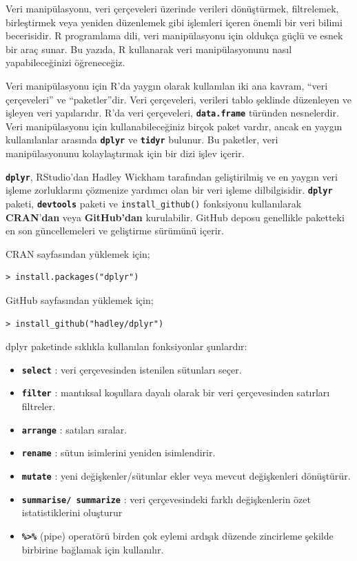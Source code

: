 \documentclass[
  letterpaper,
  DIV=11,
  numbers=noendperiod]{scrreprt}
\begin{document}
Veri manipülasyonu, veri çerçeveleri üzerinde verileri dönüştürmek,
filtrelemek, birleştirmek veya yeniden düzenlemek gibi işlemleri içeren
önemli bir veri bilimi becerisidir. R programlama dili, veri
manipülasyonu için oldukça güçlü ve esnek bir araç sunar. Bu yazıda, R
kullanarak veri manipülasyonunu nasıl yapabileceğinizi öğreneceğiz.

Veri manipülasyonu için R'da yaygın olarak kullanılan iki ana kavram,
``veri çerçeveleri'' ve ``paketler''dir. Veri çerçeveleri, verileri
tablo şeklinde düzenleyen ve işleyen veri yapılarıdır. R'da veri
çerçeveleri, \textbf{\texttt{data.frame}} türünden nesnelerdir. Veri
manipülasyonu için kullanabileceğiniz birçok paket vardır, ancak en
yaygın kullanılanlar arasında \textbf{\texttt{dplyr}} ve
\textbf{\texttt{tidyr}} bulunur. Bu paketler, veri manipülasyonunu
kolaylaştırmak için bir dizi işlev içerir.

\textbf{\texttt{dplyr}}, RStudio'dan Hadley Wickham tarafından
geliştirilmiş ve en yaygın veri işleme zorluklarını çözmenize yardımcı
olan bir veri işleme dilbilgisidir. \textbf{\texttt{dplyr}} paketi,
\textbf{\texttt{devtools}} paketi ve \texttt{install\_github()}
fonksiyonu kullanılarak \textbf{CRAN}'\textbf{dan} veya
\textbf{GitHub'dan} kurulabilir. GitHub deposu genellikle paketteki en
son güncellemeleri ve geliştirme sürümünü içerir.

CRAN sayfasından yüklemek için;

\begin{verbatim}
> install.packages("dplyr")
\end{verbatim}

GitHub sayfasından yüklemek için;

\begin{verbatim}
> install_github("hadley/dplyr")
\end{verbatim}

dplyr paketinde sıklıkla kullanılan fonksiyonlar şunlardır:

\begin{itemize}
\item
  \textbf{\texttt{select}} : veri çerçevesinden istenilen sütunları
  seçer.
\item
  \textbf{\texttt{filter}} : mantıksal koşullara dayalı olarak bir veri
  çerçevesinden satırları filtreler.
\item
  \textbf{\texttt{arrange}} : satıları sıralar.
\item
  \textbf{\texttt{rename}} : sütun isimlerini yeniden isimlendirir.
\item
  \textbf{\texttt{mutate}} : yeni değişkenler/sütunlar ekler veya mevcut
  değişkenleri dönüştürür.
\item
  \textbf{\texttt{summarise/\ summarize}} : veri çerçevesindeki farklı
  değişkenlerin özet istatistiklerini oluşturur
\item
  \textbf{\texttt{\%\textgreater{}\%}} (pipe) operatörü birden çok
  eylemi ardışık düzende zincirleme şekilde birbirine bağlamak için
  kullanılır.
\end{itemize}
\end{document}

